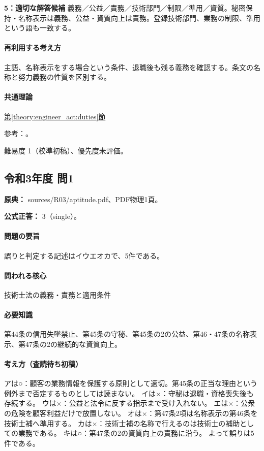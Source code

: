\noindent\textbf{5：適切な解答候補} 義務／公益／責務／技術部門／制限／準用／資質。秘密保持・名称表示は義務、公益・資質向上は責務。登録技術部門、業務の制限、準用という語も一致する。\par

\paragraph{再利用する考え方} 主語、名称表示をする場合という条件、退職後も残る義務を確認する。条文の名称と努力義務の性質を区別する。

\paragraph{共通理論} \hyperref[theory:engineer_act:duties]{第\ref*{theory:engineer_act:duties}節}

\par 参考：\cite{engineer_act_current}。

\par 難易度 1（校準初稿）、優先度未評価。

\subsection{令和3年度 問1}
\label{q:r03-reg-apt-01}

\noindent\textbf{原典：} sources/R03/aptitude.pdf、PDF物理1頁。

\textbf{公式正答：} 3（single）。

\paragraph{問題の要旨} 誤りと判定する記述はイウエオカで、5件である。

\paragraph{問われる核心} 技術士法の義務・責務と適用条件

\paragraph{必要知識} 第44条の信用失墜禁止、第45条の守秘、第45条の2の公益、第46・47条の名称表示、第47条の2の継続的な資質向上。

\paragraph{考え方（査読待ち初稿）} アは○：顧客の業務情報を保護する原則として適切。第45条の正当な理由という例外まで否定するものとしては読まない。 イは×：守秘は退職・資格喪失後も存続する。 ウは×：公益と法令に反する指示まで受け入れない。 エは×：公衆の危険を顧客利益だけで放置しない。 オは×：第47条2項は名称表示の第46条を技術士補へ準用する。 カは×：技術士補の名称で行えるのは技術士の補助としての業務である。 キは○：第47条の2の資質向上の責務に沿う。 よって誤りは5件である。

